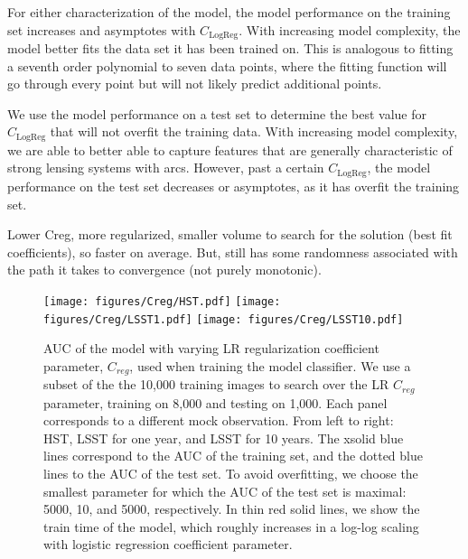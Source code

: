 \documentclass{emulateapj}
\begin{document}
For either characterization of the model, the model performance on the
training set increases and asymptotes with $C_\text{LogReg}$.  With
increasing model complexity, the model better fits the data set it has
been trained on.  This is analogous to fitting a seventh order
polynomial to seven data points, where the fitting function will go
through every point but will not likely predict additional points.

We use the model performance on a test set to determine the best value
for $C_\text{LogReg}$ that will not overfit the training data.  With
increasing model complexity, we are able to better able to capture
features that are generally characteristic of strong lensing systems
with arcs.  However, past a certain $C_\text{LogReg}$, the model
performance on the test set decreases or asymptotes, as it has overfit
the training set.

Lower Creg, more regularized, smaller volume to search for the
solution (best fit coefficients), so faster on average.  But, still
has some randomness associated with the path it takes to convergence
(not purely monotonic).

\begin{figure*}[t]\label{fig:regularization}
\begin{center}
\texttt{[image: figures/Creg/HST.pdf]}
\texttt{[image: figures/Creg/LSST1.pdf]}
\texttt{[image: figures/Creg/LSST10.pdf]}
\caption{AUC of the model with varying LR regularization coefficient
  parameter, $C_{reg}$, used when training the model classifier.  We
  use a subset of the the 10,000 training images to search over the LR
  $C_{reg}$ parameter, training on 8,000 and testing on 1,000.  Each
  panel corresponds to a different mock observation.  From left to
  right: HST, LSST for one year, and LSST for 10 years.  The xsolid
  blue lines correspond to the AUC of the training set, and the dotted
  blue lines to the AUC of the test set.  To avoid overfitting, we
  choose the smallest parameter for which the AUC of the test set is
  maximal: 5000, 10, and 5000, respectively.  In thin red solid lines,
  we show the train time of the model, which roughly increases in a
  log-log scaling with logistic regression coefficient parameter.}
\end{center}
\end{figure*}
\end{document}

